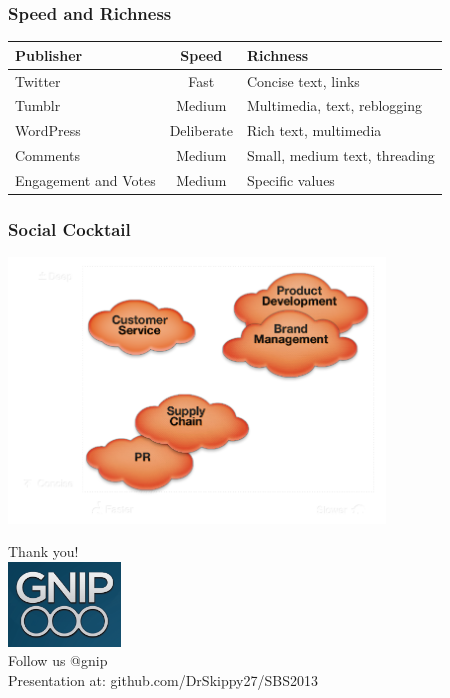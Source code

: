 \documentclass{beamer}
\begin{document}
\begin{frame} \frametitle{Speed and Richness}
\begin{table}
\begin{tabular}{p{2.2cm}| c |p{5cm}}
\hline
   {Publisher}   &   {Speed} & {Richness} \\ [3pt]
\hline 
    Twitter       & Fast & Concise text, links \\ [3pt]
    Tumblr       & Medium & Multimedia, text, reblogging\\  [3pt]
    WordPress  & Deliberate &  Rich text, multimedia\\  [3pt]
    Comments  & Medium & Small, medium text, threading\\  [3pt]
    Engagement and Votes   & Medium & Specific values\\ 
\hline
\end{tabular}
\end{table}
\end{frame}



\begin{frame}\frametitle{Social Cocktail}
  \begin{center}
    \includegraphics[width=10cm]{./imgs/socialcocktailgrid.png}
  \end{center}
\end{frame}


\begin{frame}
  \begin{center}
  \Large{Thank you!  \\ [20pt]}
    \includegraphics[width=3cm]{./imgs/logo.png} \\ [15pt]
   \Large{Follow us @gnip \\ [10pt] Presentation at: github.com/DrSkippy27/SBS2013 }
  \end{center}
\end{frame}
\end{document}
